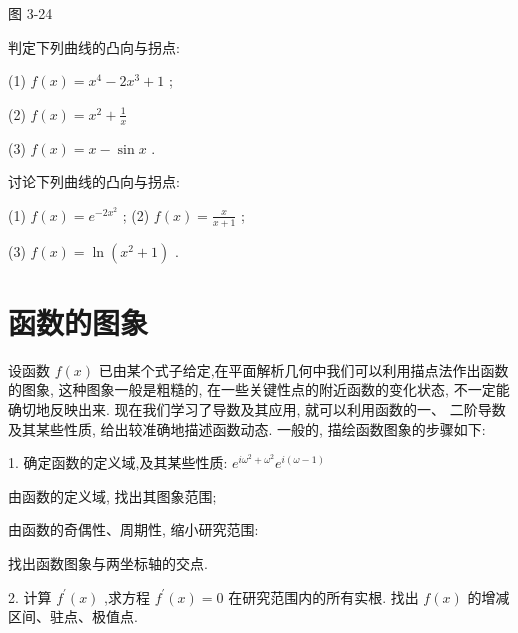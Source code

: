 \documentclass[lang=cn,newtx,12pt,scheme=chinese]{elegantbook}
\begin{document}
图 3-24

\begin{center}
\end{center}

\begin{problemset}[练习]

\item 判定下列曲线的凸向与拐点:

(1) \(f\left( x\right) = {x}^{4} - 2{x}^{3} + 1\) ;

(2) \(f\left( x\right) = {x}^{2} + \frac{1}{x}\)

(3) \(f\left( x\right) = x - \sin x\) .

\item 讨论下列曲线的凸向与拐点:

(1) \(f\left( x\right) = {e}^{-2{x}^{2}}\) ; (2) \(f\left( x\right) = \frac{x}{x + 1}\) ;

(3) \(f\left( x\right) = \ln \left( {{x}^{2} + 1}\right)\) .

\end{problemset}

\section{函数的图象}

设函数 \(f\left( x\right)\) 已由某个式子给定,在平面解析几何中我们可以利用描点法作出函数的图象, 这种图象一般是粗糙的, 在一些关键性点的附近函数的变化状态, 不一定能确切地反映出来. 现在我们学习了导数及其应用, 就可以利用函数的一、 二阶导数及其某些性质, 给出较准确地描述函数动态. 一般的, 描绘函数图象的步骤如下:

1. 确定函数的定义域,及其某些性质: \({e}^{i{\omega }^{2} + {\omega }^{2}}{e}^{i\left( {\omega - 1}\right) }\)

由函数的定义域, 找出其图象范围;

由函数的奇偶性、周期性, 缩小研究范围:

找出函数图象与两坐标轴的交点.

2. 计算 \({f}^{\prime }\left( x\right)\) ,求方程 \({f}^{\prime }\left( x\right) = 0\) 在研究范围内的所有实根. 找出 \(f\left( x\right)\) 的增减区间、驻点、极值点.
\end{document}

